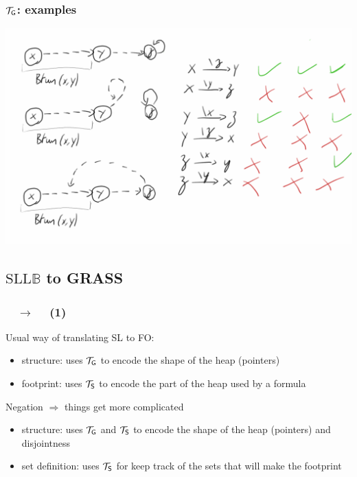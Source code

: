 \documentclass{beamer}
\begin{document}
\begin{frame}
  \frametitle{$\mathcal{T}_{\mathsf{G}}$: examples}
  \includegraphics[scale=0.25]{reach.png}
\end{frame}

\subsection{$\text{SLL}\mathbb{B}$ to GRASS}

\begin{frame}
  \frametitle{\JoshLogic $\quad \rightarrow \quad$ \LRJQ (1)}

  Usual way of translating SL to FO:
  \begin{itemize}
  \item structure: uses $\mathcal{T}_{\mathsf{G}}$ to encode the shape of the heap (pointers)
  \item footprint: uses $\mathcal{T}_{\mathsf{S}}$ to encode the part of the heap used by a formula
  \end{itemize}

  \vspace{2ex}

  Negation $\Rightarrow$ things get more complicated 
  \begin{itemize}
  \item structure: uses $\mathcal{T}_{\mathsf{G}}$ and $\mathcal{T}_{\mathsf{S}}$ to encode the shape of the heap (pointers) and disjointness
  \item set definition: uses $\mathcal{T}_{\mathsf{S}}$ for keep track of the sets that will make the footprint
  \end{itemize}

\end{frame}
\end{document}
